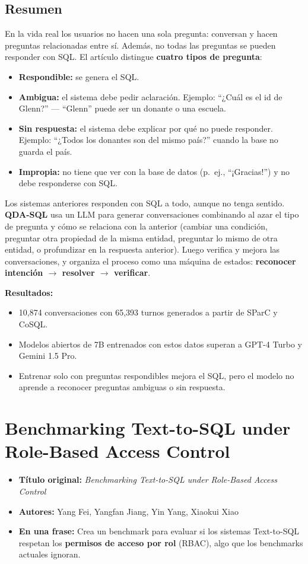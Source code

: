 \documentclass[11pt,a4paper]{article}
\newcommand{\ficha}[5]{%
  \begin{itemize}[leftmargin=*, label={}]
    \item \textbf{Título original:} \textit{#1}
    \item \textbf{Autores:} #2
    \item \textbf{En una frase:} #5
  \end{itemize}
}
\begin{document}
\subsection*{Resumen}
En la vida real los usuarios no hacen una sola pregunta: conversan y hacen preguntas relacionadas entre sí. Además, no todas las preguntas se pueden responder con SQL. El artículo distingue \textbf{cuatro tipos de pregunta}:
\begin{itemize}
  \item \textbf{Respondible:} se genera el SQL.
  \item \textbf{Ambigua:} el sistema debe pedir aclaración. Ejemplo: ``¿Cuál es el id de Glenn?'' --- ``Glenn'' puede ser un donante o una escuela.
  \item \textbf{Sin respuesta:} el sistema debe explicar por qué no puede responder. Ejemplo: ``¿Todos los donantes son del mismo país?'' cuando la base no guarda el país.
  \item \textbf{Impropia:} no tiene que ver con la base de datos (p.\ ej., ``¡Gracias!'') y no debe responderse con SQL.
\end{itemize}

Los sistemas anteriores responden con SQL a todo, aunque no tenga sentido. \textbf{QDA-SQL} usa un LLM para generar conversaciones combinando al azar el tipo de pregunta y cómo se relaciona con la anterior (cambiar una condición, preguntar otra propiedad de la misma entidad, preguntar lo mismo de otra entidad, o profundizar en la respuesta anterior). Luego verifica y mejora las conversaciones, y organiza el proceso como una máquina de estados: \textbf{reconocer intención $\rightarrow$ resolver $\rightarrow$ verificar}.

\textbf{Resultados:}
\begin{itemize}
  \item 10{,}874 conversaciones con 65{,}393 turnos generados a partir de SParC y CoSQL.
  \item Modelos abiertos de 7B entrenados con estos datos superan a GPT-4 Turbo y Gemini 1.5 Pro.
  \item Entrenar solo con preguntas respondibles mejora el SQL, pero el modelo no aprende a reconocer preguntas ambiguas o sin respuesta.
\end{itemize}

\section{Benchmarking Text-to-SQL under Role-Based Access Control}
\ficha
  {Benchmarking Text-to-SQL under Role-Based Access Control}
  {Yang Fei, Yangfan Jiang, Yin Yang, Xiaokui Xiao}
  {National University of Singapore y Hamad Bin Khalifa University}
  {arXiv:2607.22115v2 (preprint), septiembre 2026}
  {Crea un benchmark para evaluar si los sistemas Text-to-SQL respetan los \textbf{permisos de acceso por rol} (RBAC), algo que los benchmarks actuales ignoran.}
\end{document}
